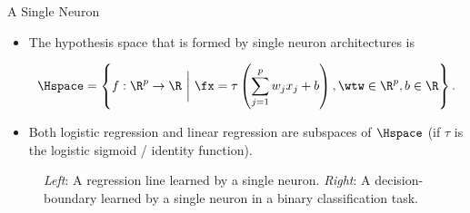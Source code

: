\begin{vbframe}{A Single Neuron}
  
\begin{itemize}
  \item The hypothesis space that is formed by single neuron architectures is 
  \begin{small}
    $$
      \Hspace  = \left\{f: \R^p \to \R ~\bigg|~ \fx = \tau\left(\sum_{j = 1}^p w_j x_j + b\right), \wtw \in \R^p, b \in \R\right\}.
    $$ 
  \end{small}
  \item Both logistic regression and linear regression are subspaces of $\Hspace$ (if $\tau$ is the logistic sigmoid / identity function).  
\end{itemize}

\vspace*{-0.48cm}

\begin{figure}
  \centering
    \vspace*{-0.2cm}
    \begin{tiny}
    \caption{\textit{Left}: A regression line learned by a single neuron. \textit{Right}: A decision-boundary learned by a single neuron in a binary classification task.}
    \end{tiny}
\end{figure}

\end{vbframe}


